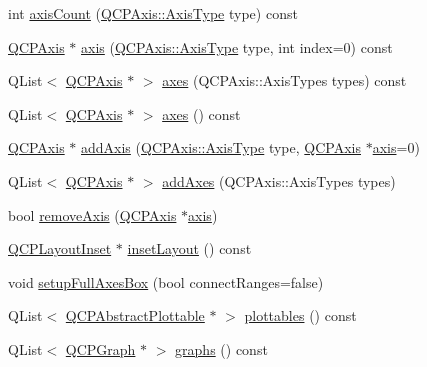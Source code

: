 \begin{DoxyCompactItemize}
\item 
int \hyperlink{classQCPAxisRect_a16e3e4646e52e4b5d5b865076c29ae58}{axis\+Count} (\hyperlink{classQCPAxis_ae2bcc1728b382f10f064612b368bc18a}{Q\+C\+P\+Axis\+::\+Axis\+Type} type) const 
\item 
\hyperlink{classQCPAxis}{Q\+C\+P\+Axis} $\ast$ \hyperlink{classQCPAxisRect_a560de44e47a4af0f86c59102a094b1e4}{axis} (\hyperlink{classQCPAxis_ae2bcc1728b382f10f064612b368bc18a}{Q\+C\+P\+Axis\+::\+Axis\+Type} type, int index=0) const 
\item 
Q\+List$<$ \hyperlink{classQCPAxis}{Q\+C\+P\+Axis} $\ast$ $>$ \hyperlink{classQCPAxisRect_a66654d51ca611ef036ded36250cd2518}{axes} (Q\+C\+P\+Axis\+::\+Axis\+Types types) const 
\item 
Q\+List$<$ \hyperlink{classQCPAxis}{Q\+C\+P\+Axis} $\ast$ $>$ \hyperlink{classQCPAxisRect_a18dcdc0dd6c7520bc9f3d15a7a3feec2}{axes} () const 
\item 
\hyperlink{classQCPAxis}{Q\+C\+P\+Axis} $\ast$ \hyperlink{classQCPAxisRect_a2dc336092ccc57d44a46194c8a23e4f4}{add\+Axis} (\hyperlink{classQCPAxis_ae2bcc1728b382f10f064612b368bc18a}{Q\+C\+P\+Axis\+::\+Axis\+Type} type, \hyperlink{classQCPAxis}{Q\+C\+P\+Axis} $\ast$\hyperlink{classQCPAxisRect_a560de44e47a4af0f86c59102a094b1e4}{axis}=0)
\item 
Q\+List$<$ \hyperlink{classQCPAxis}{Q\+C\+P\+Axis} $\ast$ $>$ \hyperlink{classQCPAxisRect_a792e1f3d9cb1591fca135bb0de9b81fc}{add\+Axes} (Q\+C\+P\+Axis\+::\+Axis\+Types types)
\item 
bool \hyperlink{classQCPAxisRect_a03c39cd9704f0d36fb6cf980cdddcbaa}{remove\+Axis} (\hyperlink{classQCPAxis}{Q\+C\+P\+Axis} $\ast$\hyperlink{classQCPAxisRect_a560de44e47a4af0f86c59102a094b1e4}{axis})
\item 
\hyperlink{classQCPLayoutInset}{Q\+C\+P\+Layout\+Inset} $\ast$ \hyperlink{classQCPAxisRect_a4114887c7141b59650b7488f930993e5}{inset\+Layout} () const 
\item 
void \hyperlink{classQCPAxisRect_a5fa906175447b14206954f77fc7f1ef4}{setup\+Full\+Axes\+Box} (bool connect\+Ranges=false)
\item 
Q\+List$<$ \hyperlink{classQCPAbstractPlottable}{Q\+C\+P\+Abstract\+Plottable} $\ast$ $>$ \hyperlink{classQCPAxisRect_a5b0d629c8de5572945eeae79a142296e}{plottables} () const 
\item 
Q\+List$<$ \hyperlink{classQCPGraph}{Q\+C\+P\+Graph} $\ast$ $>$ \hyperlink{classQCPAxisRect_afa4ff90901d9275f670e24b40e3c1b25}{graphs} () const 
\item 

\end{DoxyCompactItemize}
